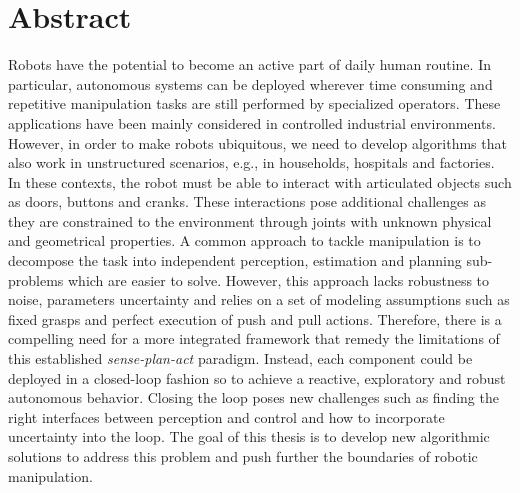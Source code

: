 \section*{Abstract}

Robots have the potential to become an active part of daily human routine. In particular, autonomous systems can be deployed wherever time consuming and repetitive manipulation tasks are still performed by specialized operators. These applications have been mainly considered in controlled industrial environments. However, in order to make robots ubiquitous, we need to develop algorithms that also work in unstructured scenarios, e.g., in households, hospitals and factories. In these contexts, the robot must be able to interact with articulated objects such as doors, buttons and cranks. These interactions pose additional challenges as they are constrained to the environment through joints with unknown physical and geometrical properties. A common approach to tackle manipulation is to decompose the task into independent perception, estimation and planning sub-problems which are easier to solve. However, this approach lacks robustness to noise, parameters uncertainty and relies on a set of modeling assumptions such as fixed grasps and perfect execution of push and pull actions. Therefore, there is a compelling need for a more integrated framework that remedy the limitations of this established \emph{sense-plan-act} paradigm. Instead, each component could be deployed in a closed-loop fashion so to achieve a reactive, exploratory and robust autonomous behavior. Closing the loop poses new challenges such as finding the right interfaces between perception and control and how to incorporate uncertainty into the loop. The goal of this thesis is to develop new algorithmic solutions to address this problem and push further the boundaries of robotic manipulation.  
